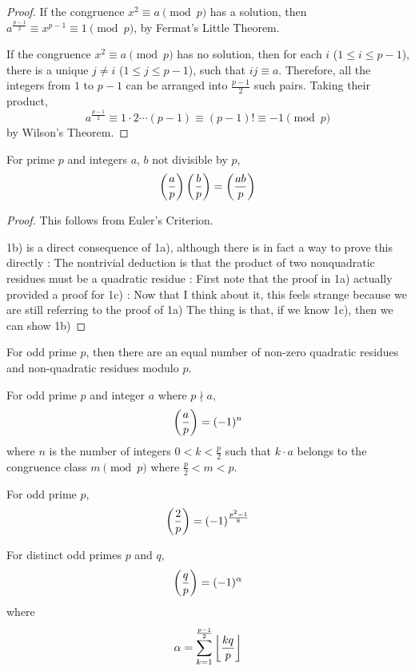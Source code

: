 \begin{proof}
If the congruence $x^2\equiv a\pmod p$ has a solution, then $a^\frac{p-1}{2}\equiv x^{p-1}\equiv1\pmod p$, by Fermat's Little Theorem.

If the congruence $x^2\equiv a\pmod p$ has no solution, then for each $i$ ($1\le i\le p-1$), there is a unique $j\neq i$ ($1\le j\le p-1$), such that $ij\equiv a$. Therefore, all the integers from $1$ to $p-1$ can be arranged into $\frac{p-1}{2}$ such pairs. Taking their product,
\[a^\frac{p-1}{2}\equiv1\cdot2\cdots(p-1)\equiv(p-1)!\equiv-1\pmod p\]
by Wilson's Theorem.
\end{proof}

\begin{proposition}[Multiplicity]
For prime $p$ and integers $a$, $b$ not divisible by $p$,
\[\left(\dfrac{a}{p}\right) \left(\dfrac{b}{p}\right) = \left(\dfrac{ab}{p}\right)\]
\end{proposition}

\begin{proof}
This follows from Euler's Criterion.

1b) is a direct consequence of 1a), although there is in fact a way to prove this directly
:
The nontrivial deduction is that the product of two nonquadratic residues must be a quadratic residue
:
First note that the proof in 1a) actually provided a proof for 1c)
:
Now that I think about it, this feels strange because we are still referring to the proof of 1a)
The thing is that, if we know 1c), then we can show 1b)
\end{proof}

\begin{proposition}
For odd prime $p$, then there are an equal number of non-zero quadratic residues and non-quadratic residues modulo $p$.
\end{proposition}

\begin{theorem}
For odd prime $p$ and integer $a$ where $p \nmid a$,
\[\left(\dfrac{a}{p}\right) = (-1)^n\]
where $n$ is the number of integers $0 < k < \frac{p}{2}$ such that $k \cdot a$ belongs to the congruence class $m \pmod p$ where $\frac{p}{2} < m < p$.
\end{theorem}

\begin{theorem}
For odd prime $p$,
\[\left(\dfrac{2}{p}\right) = (-1)^{\frac{p^2-1}{8}}\]
\end{theorem}

\begin{theorem}
For distinct odd primes $p$ and $q$,
\begin{equation}
\left(\dfrac{q}{p}\right) = (-1)^\alpha
\end{equation}
where
\[\alpha = \sum_{k=1}^{\frac{p-1}{2}}\left\lfloor \frac{kq}{p} \right\rfloor\]
\end{theorem}

